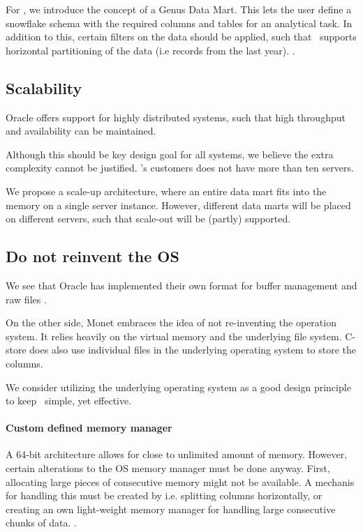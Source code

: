 For \genusSoftware, we introduce the concept of a Genus Data Mart. This lets the user define a snowflake schema with the required columns and tables for an analytical task. In addition to this, certain filters on the data should be applied, such that \projectName~supports horizontal partitioning of the data (i.e records from the last year). .

\subsection{Scalability}
\label{sub:Scalability}
Oracle offers support for highly distributed systems, such that high throughput and availability can be maintained.

Although this should be key design goal for all systems, we believe the extra complexity cannot be justified. \genus 's customers does not have more than ten servers.

We propose a scale-up architecture, where an entire data mart fits into the memory on a single server instance. However, different data marts will be placed on different servers, such that scale-out will be (partly) supported.

\subsection{Do not reinvent the OS}
\label{sub:Do not reinvent the OS}
We see that Oracle has implemented their own format for buffer management and raw files .

On the other side, Monet embraces the idea of not re-inventing the operation system. It relies heavily on the virtual memory and the underlying file system. C-store does also use individual files in the underlying operating system to store the columns.

We consider utilizing the underlying operating system as a good design principle to keep \projectName~simple, yet effective.

\paragraph{Custom defined memory manager}
\label{par:Custom defined memory manager}
A 64-bit architecture allows for close to unlimited amount of memory. However, certain alterations to the OS memory manager must be done anyway. First, allocating large pieces of consecutive memory might not be available. A mechanis for handling this must be created by i.e. splitting columns horizontally, or creating an own light-weight memory manager for handling large consecutive chunks of data. .

